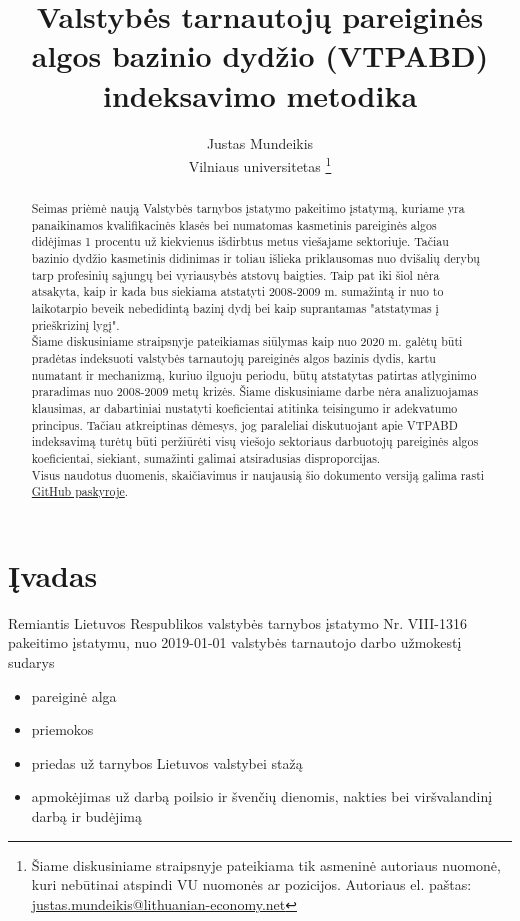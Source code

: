 \documentclass[titlepage, 11pt]{article}
\author{Justas Mundeikis\\ Vilniaus universitetas \footnote{Šiame diskusiniame straipsnyje pateikiama tik asmeninė autoriaus nuomonė, kuri nebūtinai atspindi VU nuomonės ar pozicijos. Autoriaus el. paštas: \href{mailto: justas.mundeikis@lithuanian-economy.net}{justas.mundeikis@lithuanian-economy.net} }}
\title{Valstybės tarnautojų pareiginės algos bazinio dydžio (VTPABD) \\ indeksavimo metodika}
\begin{document}
\maketitle


\begin{abstract}
Seimas priėmė naują Valstybės tarnybos įstatymo pakeitimo įstatymą, kuriame yra panaikinamos kvalifikacinės klasės bei numatomas kasmetinis pareiginės algos didėjimas 1 procentu už kiekvienus išdirbtus metus viešajame sektoriuje. Tačiau bazinio dydžio kasmetinis didinimas ir toliau išlieka priklausomas nuo dvišalių derybų tarp profesinių sąjungų bei vyriausybės atstovų baigties. Taip pat iki šiol nėra atsakyta, kaip ir kada bus siekiama atstatyti 2008-2009 m. sumažintą ir nuo to laikotarpio beveik nebedidintą bazinį dydį bei kaip suprantamas "atstatymas į prieškrizinį lygį".\\ 
Šiame diskusiniame straipsnyje pateikiamas siūlymas kaip nuo 2020 m. galėtų būti pradėtas indeksuoti valstybės tarnautojų pareiginės algos bazinis dydis, kartu numatant ir mechanizmą, kuriuo ilguoju periodu, būtų atstatytas patirtas atlyginimo praradimas nuo 2008-2009 metų krizės. Šiame diskusiniame darbe nėra analizuojamas klausimas, ar dabartiniai nustatyti koeficientai atitinka teisingumo ir adekvatumo principus. Tačiau atkreiptinas dėmesys, jog paraleliai diskutuojant apie VTPABD indeksavimą turėtų būti peržiūrėti visų viešojo sektoriaus darbuotojų pareiginės algos koeficientai, siekiant, sumažinti galimai atsiradusias disproporcijas.\\
Visus naudotus duomenis, skaičiavimus ir naujausią šio dokumento versiją galima rasti \href{https://github.com/justasmundeikis/VTPABD}{GitHub paskyroje}.
\end{abstract}

\tableofcontents
\newpage

\section{Įvadas}
Remiantis Lietuvos Respublikos valstybės tarnybos įstatymo Nr. VIII-1316 pakeitimo įstatymu, nuo 2019-01-01 valstybės tarnautojo darbo užmokestį sudarys 
\begin{itemize}
\setlength\itemsep{-0.5em}
\item pareiginė alga
\item priemokos
\item priedas už tarnybos Lietuvos valstybei stažą
\item apmokėjimas už darbą poilsio ir švenčių dienomis, nakties bei viršvalandinį darbą ir budėjimą
\end{itemize}
\end{document}
